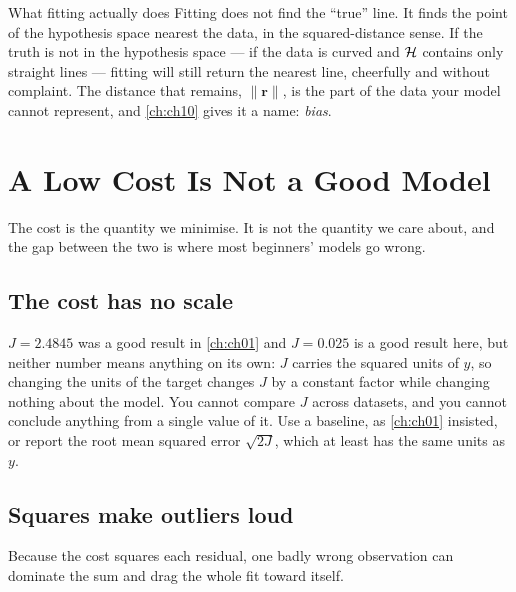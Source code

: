 \begin{keyinsight}{What fitting actually does}
Fitting does not find the ``true'' line. It finds the point of the hypothesis
space nearest the data, in the squared-distance sense. If the truth is not in
the hypothesis space --- if the data is curved and $\mathcal{H}$ contains only
straight lines --- fitting will still return the nearest line, cheerfully and
without complaint. The distance that remains, $\|\mathbf{r}\|$, is the part of
the data your model cannot represent, and \cref{ch:ch10} gives it a name:
\emph{bias}.
\end{keyinsight}

\section{A Low Cost Is Not a Good Model}
\label{sec:low-cost}

The cost is the quantity we minimise. It is not the quantity we care about, and
the gap between the two is where most beginners' models go wrong.

\subsection{The cost has no scale}

$J = 2.4845$ was a good result in \cref{ch:ch01} and $J = 0.025$ is a good
result here, but neither number means anything on its own: $J$ carries the
squared units of $y$, so changing the units of the target changes $J$ by a
constant factor while changing nothing about the model. You cannot compare $J$
across datasets, and you cannot conclude anything from a single value of it. Use
a baseline, as \cref{ch:ch01} insisted, or report the root mean squared error
$\sqrt{2J}$, which at least has the same units as $y$.

\subsection{Squares make outliers loud}

Because the cost squares each residual, one badly wrong observation can dominate
the sum and drag the whole fit toward itself.

